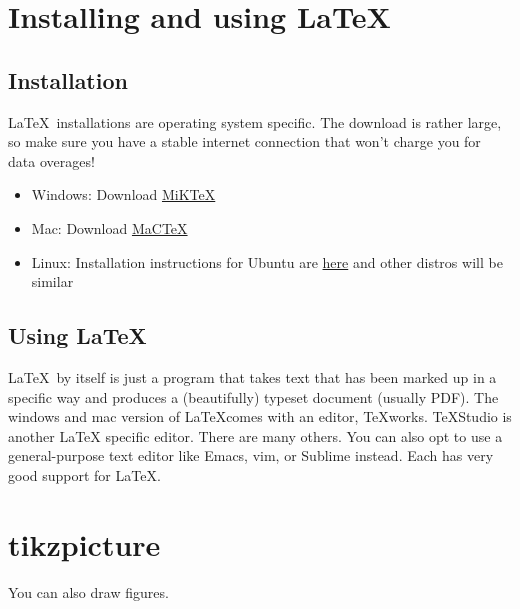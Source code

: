\documentclass[12pt]{article} %
\begin{document}
 

\newpage
\appendix

\section{Installing and using \LaTeX}
\label{sec:inst-using-latex}

\subsection{Installation }
\label{sec:installation-}

\LaTeX~installations are operating system specific. The download is rather large, so
make sure you have a stable internet connection that won't charge you
for data overages! 
\begin{itemize}
\item Windows: Download \href{http://miktex.org/}{MiKTeX}
\item Mac: Download
  \href{https://tug.org/mactex/mactex-download.html}{MaCTeX}
\item Linux: Installation instructions for Ubuntu are
  \href{http://tex.stackexchange.com/questions/1092/how-to-install-vanilla-texlive-on-debian-or-ubuntu/95373#95373}{here} 
  and other distros will be similar
\end{itemize}

\subsection{Using \LaTeX}
\label{sec:using-latex}

\LaTeX~by itself is just a program that takes text that has been
marked up in a specific way and produces a (beautifully) typeset
document (usually PDF). The windows and mac version of \LaTeX comes with an editor, TeXworks. TeXStudio is another LaTeX specific editor. There are many others.  You can also opt to use a general-purpose text editor like Emacs, vim, or Sublime instead. Each has very good support for \LaTeX.  

\newpage
\section{tikzpicture}
You can also draw figures.
\end{document}
